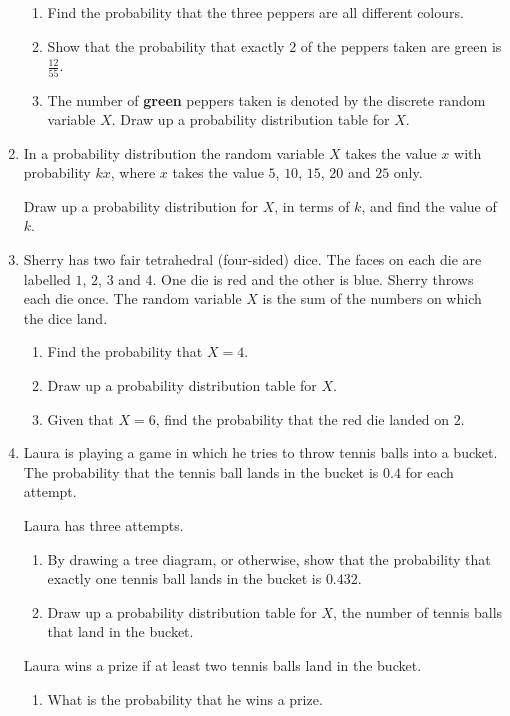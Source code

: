 \begin{enumerate}
	\begin{enumerate}
		\item Find the probability that the three peppers are all different colours.
		\item Show that the probability that exactly $2$ of the peppers taken are green is $\frac{12}{55}$.
		\item The number of \textbf{green} peppers taken is denoted by the discrete random variable $X$. Draw up a probability distribution table for $X$.
	\end{enumerate}
	
	
	
	\item In a probability distribution the random variable $X$ takes the value $x$ with probability $kx$, where $x$ takes the value $5$, $10$, $15$, $20$ and $25$ only.
	
	Draw up a probability distribution for $X$, in terms of $k$, and find the value of $k$.
	
	
	\item Sherry has two fair tetrahedral (four-sided) dice. The faces on each die are labelled $1$, $2$, $3$ and $4$. One die is red and the other is blue. Sherry throws  each die once. The random variable $X$ is the sum of the numbers on which the dice land.
	
	\begin{enumerate}
		\item Find the probability that $X=4$.
		\item Draw up a probability distribution table for $X$.
		\item Given that $X=6$, find the probability that the red die landed on $2$.
	\end{enumerate} 
	
	
	\item Laura is playing a game in which he tries to throw tennis balls  into a bucket. The probability that the tennis ball lands in the bucket is $0.4$ for each attempt.
	
	Laura has three attempts.
	
	\begin{enumerate}
		\item By drawing a tree diagram, or otherwise, show that the probability that exactly one tennis ball lands in the bucket is $0.432$.
		
		\item Draw up a probability distribution table for $X$, the number of tennis balls that land in the bucket.
	\end{enumerate}
	
	
	Laura wins a prize if at least two tennis balls  land in the bucket.
	
	\begin{enumerate}[resume]
		\item What is the probability that he wins a prize.
	\end{enumerate}
	
	
\end{enumerate}
	
